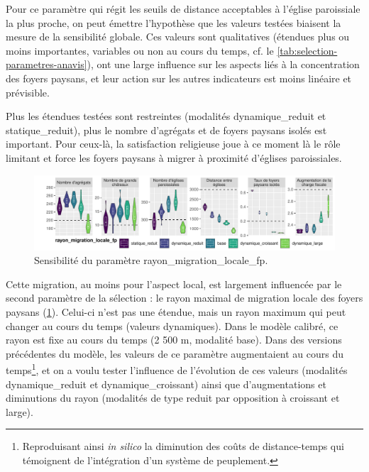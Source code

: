Pour ce paramètre qui régit les seuils de distance acceptables à l'église paroissiale la plus proche, on peut émettre l'hypothèse que les valeurs testées biaisent la mesure de la sensibilité globale.
Ces valeurs sont qualitatives (étendues plus ou moins importantes, variables ou non au cours du temps, cf. le \cref{tab:selection-parametres-anavis}), ont une large influence sur les aspects liés à la concentration des foyers paysans, et leur action sur les autres indicateurs est moins linéaire et prévisible.

Plus les étendues testées sont restreintes (modalités \og dynamique\_reduit\fg{} et \og statique\_reduit\fg{}), plus le nombre d'agrégats et de foyers paysans isolés est important.
Pour ceux-là, la satisfaction religieuse joue à ce moment là le rôle limitant et \og force\fg{} les foyers paysans à migrer à proximité d'églises paroissiales.

\begin{figure}[H]
	\centering
	\includegraphics[width=\linewidth]{img/sensib/sensibilite_rayon_migration_locale_fp.pdf}
	\caption{Sensibilité du paramètre \textsf{rayon\_migration\_locale\_fp}.}
	\label{fig:sensib-fp-2}
\end{figure}

Cette migration, au moins pour l'aspect local, est largement influencée par le second paramètre de la sélection : le rayon maximal de migration locale des foyers paysans (\cref{fig:sensib-fp-2}). 
Celui-ci n'est pas une étendue, mais un rayon maximum qui peut changer au cours du temps (valeurs \og dynamiques\fg{}).
Dans le modèle calibré, ce rayon est fixe au cours du temps (2 500 m, modalité \og base\fg{}).
Dans des versions précédentes du modèle, les valeurs de ce paramètre augmentaient au cours du temps\footnote{
	Reproduisant ainsi \textit{in silico} la diminution des coûts de distance-temps qui témoignent de l'intégration d'un système de peuplement.
}, et on a voulu tester l'influence de l'évolution de ces valeurs (modalités \og dynamique\_reduit\fg{} et \og dynamique\_croissant\fg{}) ainsi que d'augmentations et diminutions du rayon (modalités de type \og reduit\fg{} par opposition à \og croissant\fg{} et \og large\fg{}).

